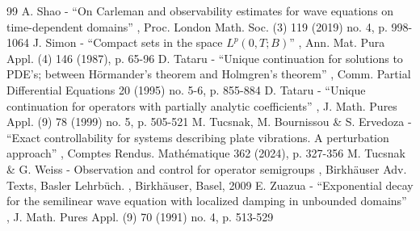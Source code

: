 \documentclass[11pt]{article}
\theoremstyle{definition}
\begin{document}
\begin{thebibliography}{99}
 A. Shao - “On Carleman and observability estimates for wave equations on time-dependent domains” , Proc. London Math. Soc. (3) 119 (2019) no. 4, p. 998-1064
 J. Simon - “Compact sets in the space $L^p(0,T;B)$” , Ann. Mat. Pura Appl. (4) 146 (1987), p. 65-96
 D. Tataru - “Unique continuation for solutions to PDE’s; between Hörmander’s theorem and Holmgren’s theorem” , Comm. Partial Differential Equations 20 (1995) no. 5-6, p. 855-884
 D. Tataru - “Unique continuation for operators with partially analytic coefficients” , J. Math. Pures Appl. (9) 78 (1999) no. 5, p. 505-521
 M. Tucsnak, M. Bournissou \& S. Ervedoza - “Exact controllability for systems describing plate vibrations. A perturbation approach” , Comptes Rendus. Mathématique 362 (2024), p. 327-356
 M. Tucsnak \& G. Weiss - Observation and control for operator semigroups , Birkhäuser Adv. Texts, Basler Lehrbüch. , Birkhäuser, Basel, 2009
 E. Zuazua - “Exponential decay for the semilinear wave equation with localized damping in unbounded domains” , J. Math. Pures Appl. (9) 70 (1991) no. 4, p. 513-529
\end{thebibliography}
\end{document}
